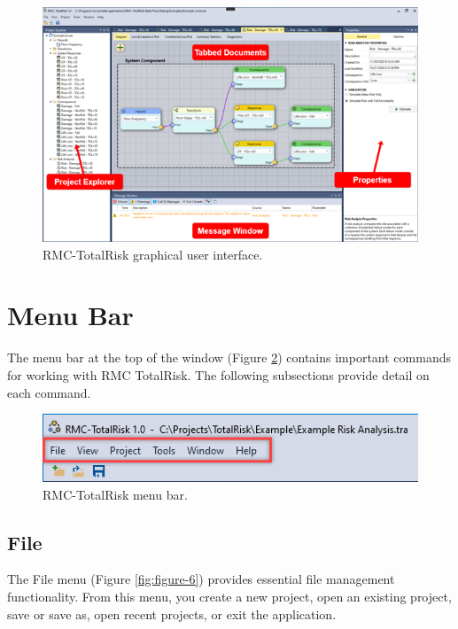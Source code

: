 \documentclass[
]{book}
\begin{document}
\begin{figure}

{\centering \includegraphics{images/figure4} 

}

\caption{RMC-TotalRisk graphical user interface.}\label{fig:figure-4}
\end{figure}

\hypertarget{gui-menu-bar}{%
\section{Menu Bar}\label{gui-menu-bar}}

The menu bar at the top of the window (Figure \ref{fig:figure-5}) contains important commands for working with RMC TotalRisk. The following subsections provide detail on each command.

\begin{figure}

{\centering \includegraphics{images/figure5} 

}

\caption{RMC-TotalRisk menu bar.}\label{fig:figure-5}
\end{figure}

\hypertarget{gui-menu-bar-file}{%
\subsection{File}\label{gui-menu-bar-file}}

The File menu (Figure \ref{fig:figure-6}) provides essential file management functionality. From this menu, you create a new project, open an existing project, save or save as, open recent projects, or exit the application.
\end{document}
